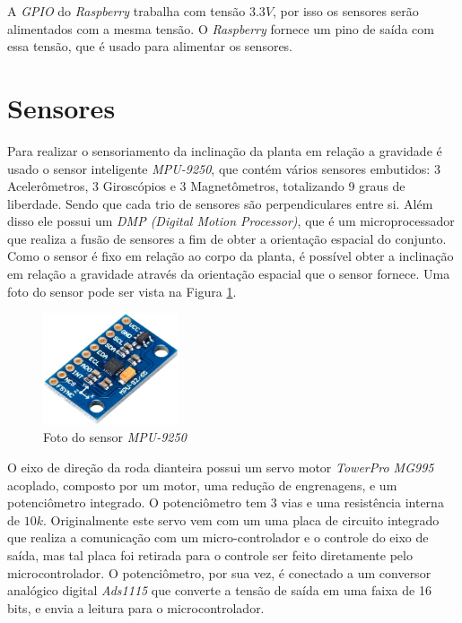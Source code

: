 	    A \textit{GPIO} do \textit{Raspberry} trabalha com tensão $3.3V$, por isso os sensores serão alimentados com a mesma tensão. O \textit{Raspberry} fornece um pino de saída com essa tensão, que é usado para alimentar os sensores.
    
    \section{Sensores}
    
    	Para realizar o sensoriamento da inclinação da planta em relação a gravidade é usado o sensor inteligente \textit{MPU-9250}, que contém vários sensores embutidos: 3 Acelerômetros, 3 Giroscópios e 3 Magnetômetros, totalizando 9 graus de liberdade. Sendo que cada trio de sensores são perpendiculares entre si. Além disso ele possui um \textit{DMP (Digital Motion Processor)}, que é um microprocessador que realiza a fusão de sensores a fim de obter a orientação espacial do conjunto. Como o sensor é fixo em relação ao corpo da planta, é possível obter a inclinação em relação a gravidade através da orientação espacial que o sensor fornece. Uma foto do sensor pode ser vista na Figura \ref{img:mpu}.
    	
    	\begin{figure}[h]
            \centering
            \includegraphics[width=4cm]{Imagens/cap2/mpu.png}
            \caption{Foto do sensor \textit{MPU-9250}}
            \label{img:mpu}
        \end{figure}
        
    	O eixo de direção da roda dianteira possui um servo motor \textit{TowerPro MG995} acoplado, composto por um motor, uma redução de engrenagens, e um potenciômetro integrado. O potenciômetro tem 3 vias e uma resistência interna de $10k$. Originalmente este servo vem com um uma placa de circuito integrado que realiza a comunicação com um micro-controlador e o controle do eixo de saída, mas tal placa foi retirada para o controle ser feito diretamente pelo microcontrolador. O potenciômetro, por sua vez, é conectado a um conversor analógico digital \textit{Ads1115} que converte a tensão de saída em uma faixa de 16 bits, e envia a leitura para o microcontrolador.
	
